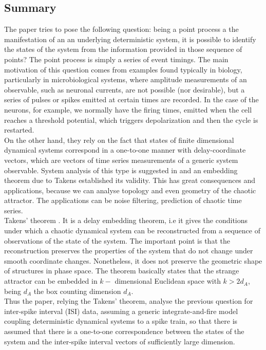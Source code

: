 \documentclass[10pt]{article}
\begin{document}
\subsection{Summary}
The paper \cite{interspike} tries to pose the following question: being a point process a the manifestation of an an underlying deterministic system, it is possible to identify the states of the system from the information provided in those sequence of points? The point process is simply a series of event timings. The main motivation of this question comes from examples found typically in biology, particularly in microbiological systems, where amplitude measurements of an observable, such as neuronal currents, are not possible (nor desirable), but a series of pulses or spikes emitted at certain times are recorded. In the case of the neurons, for example, we normally have the firing times, emitted when the cell reaches a threshold potential, which triggers depolarization and then the cycle is restarted.\\
On the other hand, they rely on the fact that states of finite dimensional dynamical systems correspond in a one-to-one manner with delay-coordinate vectors, which are vectors of time series measurements of a generic system observable. System analysis of this type is suggested in and an embedding theorem due to Takens established its validity. This has great consequences and applications, because we can analyse topology and even geometry of the chaotic attractor. The applications can be noise filtering, prediction of chaotic time series.\\
Takens' theorem \cite{takens}. It is a delay embedding theorem, i.e it gives the conditions under which a chaotic dynamical system can be reconstructed from a sequence of observations of the state of the system. The important point is that the reconstruction preserves the properties of the system that do not change under smooth coordinate changes. Nonetheless, it does not preserve the geometric shape of structures in phase space. The theorem basically states that the strange attractor can be embedded in $k-$ dimensional Euclidean space with $k>2d_A$, being $d_A$ the box counting dimension $d_A$.\\
Thus the paper, relying the Takens' theorem, analyse the previous question for inter-spike interval (ISI) data, assuming a generic integrate-and-fire model coupling deterministic dynamical systems to a spike train, so that there is assumed that there is a one-to-one correspondence between the states of the system and the inter-spike interval vectors of sufficiently large dimension. \\
\end{document}
